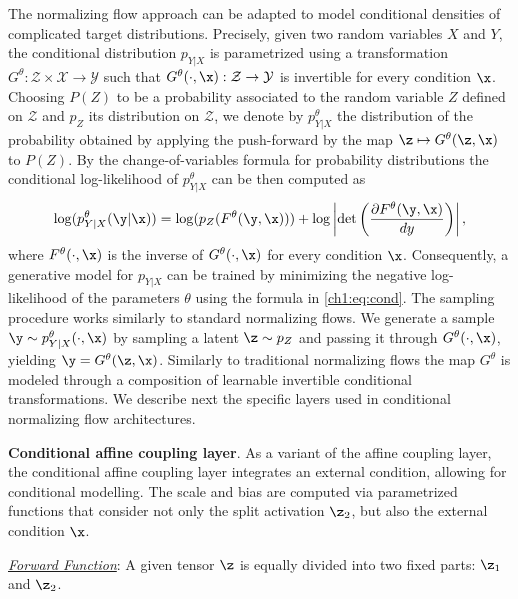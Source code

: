 The normalizing flow approach can be adapted to model conditional densities of complicated target distributions. Precisely, given two random variables $X$ and $Y$, the conditional distribution $p_{Y|X}$ is parametrized using a transformation $G^\theta : \mathcal{Z} \times \mathcal{X} \rightarrow \mathcal{Y}$ such that $G^\theta(\cdot, \x) : \mathcal{Z} \rightarrow \mathcal{Y}$ is invertible for every condition $\x$. Choosing $P(Z)$ to be a probability associated to the random variable $Z$ defined on $\mathcal{Z}$ and $p_Z$ its distribution on $\mathcal{Z}$, we denote by $p^\theta_{Y|X}$ the distribution of the probability obtained by applying the push-forward by the map $ \z \mapsto G^\theta(\z, \x)$ to $P(Z)$. By the change-of-variables formula for probability distributions the conditional log-likelihood of $p^\theta_{Y|X}$ can be then computed as 
\begin{align}\label{ch1:eq:cond}
\log(p^\theta_{Y|X}(\y|\x)) = \log(p_{Z}(F^\theta(\y,\x)))   +  \log\left| \det \left(\frac{\partial F^{\theta}(\y,\x)}{dy} \right)\right|,
\end{align}
where $F^\theta(\cdot, \x)$ is the inverse of $G^\theta(\cdot, \x)$ for every condition $\x$.
Consequently, a generative model for $p_{Y|X}$ can be trained by minimizing the negative log-likelihood of the parameters $\theta$ using the formula in \eqref{ch1:eq:cond}. The sampling procedure works similarly to standard normalizing flows. We generate a sample $\y \sim p^\theta_{Y|X}(\cdot, \x)$ by sampling a latent $\z\sim p_Z$ and passing it through $G^\theta(\cdot, \x)$, yielding $\y=G^\theta(\z, \x)$. Similarly to traditional normalizing flows the map $G^\theta$ is modeled through a composition of learnable invertible conditional transformations. We describe next the specific layers used in conditional normalizing flow architectures.

\medskip

\textbf{Conditional affine coupling layer}. As a variant of the affine coupling layer, the conditional affine coupling layer integrates an external condition, allowing for conditional modelling. The scale and bias are computed via parametrized functions that consider not only the split activation \(\z_2\), but also the external condition \(\x\). 

\smallskip



\textit{\underline{Forward Function}}:
A given tensor \(\z\) is equally divided into two fixed parts: \(\z_1\) and \(\z_2\). 

